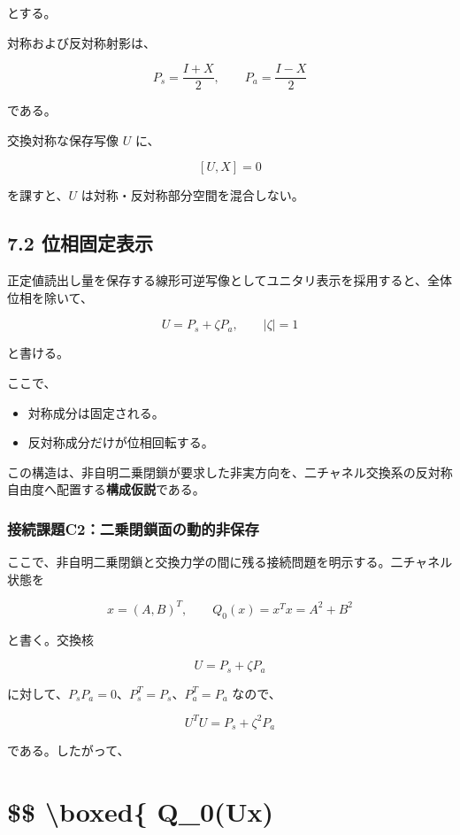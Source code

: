 \documentclass[
  a4paper,
  10pt]{article}
\providecommand{\tightlist}{%
  \setlength{\itemsep}{0pt}\setlength{\parskip}{0pt}}
\begin{document}
とする。

対称および反対称射影は、

\[
P_s=\frac{I+X}{2},
\qquad
P_a=\frac{I-X}{2}
\]

である。

交換対称な保存写像 \(U\) に、

\[
[U,X]=0
\]

を課すと、\(U\) は対称・反対称部分空間を混合しない。

\subsection{7.2
位相固定表示}\label{72-ux4f4dux76f8ux56faux5b9aux8868ux793a}

正定値読出し量を保存する線形可逆写像としてユニタリ表示を採用すると、全体位相を除いて、

\[
\boxed{
U=P_s+\zeta P_a,
\qquad |\zeta|=1
}
\]

と書ける。

ここで、

\begin{itemize}
\tightlist
\item
  対称成分は固定される。
\item
  反対称成分だけが位相回転する。
\end{itemize}

この構造は、非自明二乗閉鎖が要求した非実方向を、二チャネル交換系の反対称自由度へ配置する\textbf{構成仮説}である。

\subsubsection{接続課題C2：二乗閉鎖面の動的非保存}\label{ux63a5ux7d9aux8ab2ux984cc2ux4e8cux4e57ux9589ux9396ux9762ux306eux52d5ux7684ux975eux4fddux5b58}

ここで、非自明二乗閉鎖と交換力学の間に残る接続問題を明示する。二チャネル状態を

\[
x=(A,B)^T,
\qquad
Q_0(x)=x^Tx=A^2+B^2
\]

と書く。交換核

\[
U=P_s+\zeta P_a
\]

に対して、\(P_sP_a=0\)、\(P_s^T=P_s\)、\(P_a^T=P_a\) なので、

\[
U^TU=P_s+\zeta^2P_a
\]

である。したがって、

\section{\$\$ \textbackslash boxed\{ Q\_0(Ux)}\label{-boxed-q_0ux}
\end{document}
